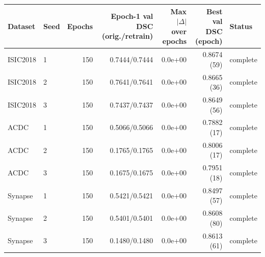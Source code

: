 \begin{tabular}{llrrrrl}
\toprule
Dataset & Seed & Epochs & Epoch-1 val DSC (orig./retrain) & Max $|\Delta|$ over epochs & Best val DSC (epoch) & Status \\
\midrule
ISIC2018 & 1 & 150 & 0.7444/0.7444 & 0.0e+00 & 0.8674 (59) & complete \\
ISIC2018 & 2 & 150 & 0.7641/0.7641 & 0.0e+00 & 0.8665 (36) & complete \\
ISIC2018 & 3 & 150 & 0.7437/0.7437 & 0.0e+00 & 0.8649 (56) & complete \\
ACDC & 1 & 150 & 0.5066/0.5066 & 0.0e+00 & 0.7882 (17) & complete \\
ACDC & 2 & 150 & 0.1765/0.1765 & 0.0e+00 & 0.8006 (17) & complete \\
ACDC & 3 & 150 & 0.1675/0.1675 & 0.0e+00 & 0.7951 (18) & complete \\
Synapse & 1 & 150 & 0.5421/0.5421 & 0.0e+00 & 0.8497 (57) & complete \\
Synapse & 2 & 150 & 0.5401/0.5401 & 0.0e+00 & 0.8608 (80) & complete \\
Synapse & 3 & 150 & 0.1480/0.1480 & 0.0e+00 & 0.8613 (61) & complete \\
\bottomrule
\end{tabular}
